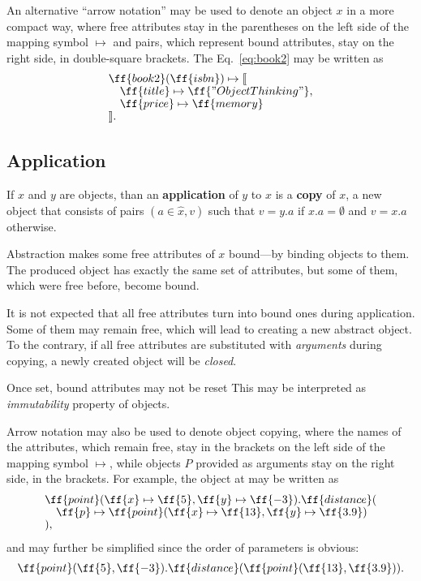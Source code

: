 An alternative ``arrow notation'' may be used to denote an object $x$ in a more
compact way, where free attributes stay in the parentheses on the left side of the
mapping symbol $\mapsto$ and pairs,
which represent bound attributes, stay on the right side, in double-square brackets.
The Eq.~\ref{eq:book2} may be written as
\begin{equation}\label{eq:book2-compact}
\begin{split}
& \ff{book2}(\ff{isbn}) \mapsto \llbracket \br
& \quad \ff{title} \mapsto \ff{"Object Thinking"}, \br
& \quad \ff{price} \mapsto \ff{memory} \br
& \rrbracket. \\
\end{split}
\end{equation}

\subsection{Application}

\begin{eodefinition}\label{def:application}
If $x$ and $y$ are objects, than an \textbf{application} of $y$ to $x$ is
  a \textbf{copy} of $x$, a new object that consists of pairs $(a\in\hat{x},v)$ such that
  $v=y.a$ if $x.a=\emptyset$ and $v=x.a$ otherwise.
\end{eodefinition}

Abstraction makes some free attributes of $x$ bound---by binding objects to them.
The produced object has exactly the same set of attributes, but some of them,
which were free before, become bound.

It is not expected that all free attributes turn into bound ones during application.
Some of them may remain free, which will lead
to creating a new abstract object. To the contrary,
if all free attributes are substituted with \emph{arguments} during copying,
a newly created object will be \emph{closed}.

Once set, bound attributes may not be reset
This may be interpreted as \emph{immutability} property of objects.

Arrow notation may also be used to denote object copying,
where the names of the attributes, which remain free, stay in the brackets
on the left side of the mapping symbol $\mapsto$,
while objects $P$ provided as arguments stay on the right side,
in the brackets. For example, the object at  may be written as
\begin{equation}\label{eq:point}
\begin{split}
& \ff{point}(\ff{x} \mapsto \ff{5}, \ff{y} \mapsto \ff{-3}).\ff{distance}(\br
& \quad \ff{p} \mapsto \ff{point}(\ff{x} \mapsto \ff{13}, \ff{y} \mapsto \ff{3.9}) \br
& ),
\end{split}
\end{equation}
and may further be simplified since the order of parameters is obvious:
\begin{equation}
\begin{split}
\ff{point}(\ff{5}, \ff{-3}).\ff{distance}(\ff{point}(\ff{13}, \ff{3.9})).
\end{split}
\end{equation}

